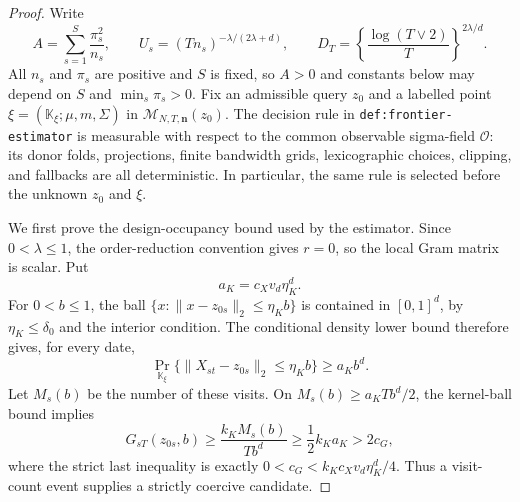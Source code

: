 \documentclass{article}
\begin{document}
\begin{proof}
Write
\[
 A=\sum_{s=1}^{S}\frac{\pi_s^2}{n_s},\qquad
 U_s=(Tn_s)^{-\lambda/(2\lambda+d)},\qquad
 D_T=\left\{\frac{\log(T\vee2)}{T}\right\}^{2\lambda/d}.       \tag{1}
\]
All \(n_s\) and \(\pi_s\) are positive and \(S\) is fixed, so \(A>0\)
and constants below may depend on \(S\) and
\(\min_s\pi_s>0\).  Fix an admissible query \(z_0\) and a labelled point
\(\xi=(\mathbb K_\xi;\mu,m,\Sigma)\) in
\(\mathcal M_{N,T,\mathbf n}(z_0)\).  The decision rule in
\texttt{def:frontier-estimator} is measurable with respect to the common
observable sigma-field \(\mathcal O\): its donor folds, projections, finite
bandwidth grids, lexicographic choices, clipping, and fallbacks are all
deterministic.  In particular, the same rule is selected before the unknown
\(z_0\) and \(\xi\).

We first prove the design-occupancy bound used by the estimator.  Since
\(0<\lambda\le1\), the order-reduction convention gives \(r=0\), so the
local Gram matrix is scalar.  Put
\[
 a_K=c_Xv_d\eta_K^d.
\]
For \(0<b\le1\), the ball
\(\{x:\|x-z_{0s}\|_2\le\eta_Kb\}\) is contained in \([0,1]^d\), by
\(\eta_K\le\delta_0\) and the interior condition.  The conditional density
lower bound therefore gives, for every date,
\[
 \Pr_{\mathbb K_\xi}
 \{\|X_{st}-z_{0s}\|_2\le\eta_Kb\}
 \ge a_Kb^d.                                                   \tag{2}
\]
Let \(M_s(b)\) be the number of these visits.  On
\(M_s(b)\ge a_KTb^d/2\), the kernel-ball bound implies
\[
 G_{sT}(z_{0s},b)
 \ge \frac{k_KM_s(b)}{Tb^d}
 \ge\frac12k_Ka_K>2c_G,                                      \tag{3}
\]
where the strict last inequality is exactly
\(0<c_G<k_Kc_Xv_d\eta_K^d/4\).  Thus a visit-count event supplies a
strictly coercive candidate.


\end{proof}
\end{document}
